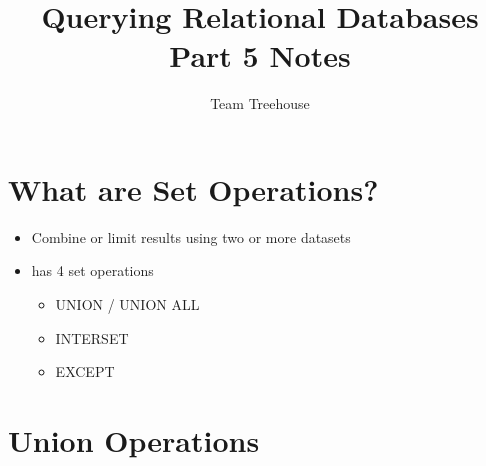 \documentclass[12pt]{article}
\begin{document}
\title{Querying Relational Databases Part 5 Notes}
\author{Team Treehouse}
\maketitle

\bigskip

\section{What are Set Operations?}

\bigskip

\begin{itemize}
    \item Combine or limit results using two or more datasets
    \item has 4 set operations
    \begin{itemize}
        \item UNION / UNION ALL
        \item INTERSET
        \item EXCEPT
    \end{itemize}
\end{itemize}

\bigskip

\section{Union Operations}

\bigskip
\end{document}
